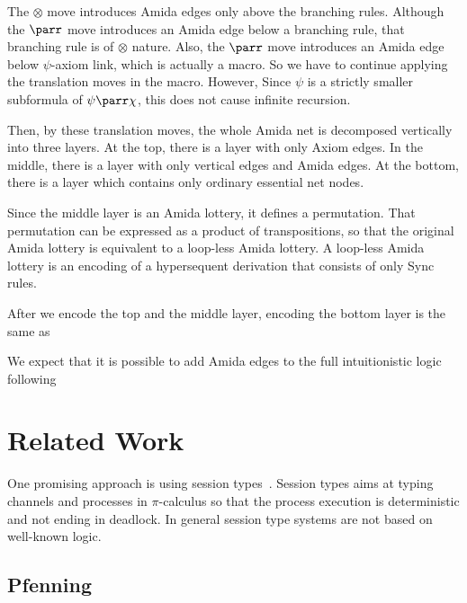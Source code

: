 The $\otimes$ move introduces Amida edges only above the branching rules.
Although the $\parr$ move introduces an Amida edge below a
branching rule, that branching rule is of $\otimes$ nature.
Also, the $\parr$ move introduces an Amida edge below $\psi$-axiom link,
which is actually a macro.  So we have to continue applying the
translation moves in the macro.  However, Since $\psi$ is a strictly
smaller subformula of $\psi\parr\chi$, this does not cause infinite
recursion.

Then, by these translation moves,
the whole Amida net is decomposed vertically into three layers.
At the top, there is a layer with only Axiom edges.
In the middle, there is a layer with only vertical edges and Amida
edges.
At the bottom, there is a layer which contains only ordinary
essential net nodes.

Since the middle layer is an Amida lottery, it defines a permutation.
That permutation can be expressed as a product of transpositions, so
that
the original Amida lottery is equivalent to a loop-less Amida lottery.
A loop-less Amida lottery is an encoding of a hypersequent derivation
that consists of only Sync rules.

After we encode the top and the middle layer, encoding the bottom layer
is the same as 


We expect that it is possible to add Amida edges to
the full intuitionistic logic following
\citet{groote1999}


\section{Related Work}

One promising approach is using session types~\citep{honda-session}.
Session types aims at typing channels and processes in $\pi$-calculus so
that the process execution is deterministic and not ending in deadlock.
In general session type systems are not based on well-known logic.




\subsection{Pfenning}


